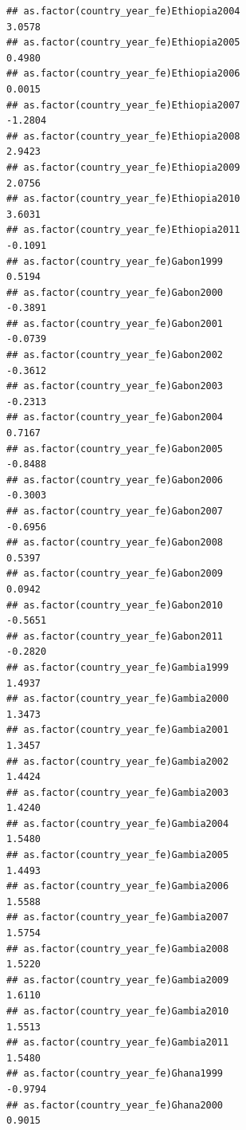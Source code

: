 \documentclass[
  a4paper,
]{article}
\begin{document}
\begin{verbatim}
## as.factor(country_year_fe)Ethiopia2004                          3.0578
## as.factor(country_year_fe)Ethiopia2005                          0.4980
## as.factor(country_year_fe)Ethiopia2006                          0.0015
## as.factor(country_year_fe)Ethiopia2007                         -1.2804
## as.factor(country_year_fe)Ethiopia2008                          2.9423
## as.factor(country_year_fe)Ethiopia2009                          2.0756
## as.factor(country_year_fe)Ethiopia2010                          3.6031
## as.factor(country_year_fe)Ethiopia2011                         -0.1091
## as.factor(country_year_fe)Gabon1999                             0.5194
## as.factor(country_year_fe)Gabon2000                            -0.3891
## as.factor(country_year_fe)Gabon2001                            -0.0739
## as.factor(country_year_fe)Gabon2002                            -0.3612
## as.factor(country_year_fe)Gabon2003                            -0.2313
## as.factor(country_year_fe)Gabon2004                             0.7167
## as.factor(country_year_fe)Gabon2005                            -0.8488
## as.factor(country_year_fe)Gabon2006                            -0.3003
## as.factor(country_year_fe)Gabon2007                            -0.6956
## as.factor(country_year_fe)Gabon2008                             0.5397
## as.factor(country_year_fe)Gabon2009                             0.0942
## as.factor(country_year_fe)Gabon2010                            -0.5651
## as.factor(country_year_fe)Gabon2011                            -0.2820
## as.factor(country_year_fe)Gambia1999                            1.4937
## as.factor(country_year_fe)Gambia2000                            1.3473
## as.factor(country_year_fe)Gambia2001                            1.3457
## as.factor(country_year_fe)Gambia2002                            1.4424
## as.factor(country_year_fe)Gambia2003                            1.4240
## as.factor(country_year_fe)Gambia2004                            1.5480
## as.factor(country_year_fe)Gambia2005                            1.4493
## as.factor(country_year_fe)Gambia2006                            1.5588
## as.factor(country_year_fe)Gambia2007                            1.5754
## as.factor(country_year_fe)Gambia2008                            1.5220
## as.factor(country_year_fe)Gambia2009                            1.6110
## as.factor(country_year_fe)Gambia2010                            1.5513
## as.factor(country_year_fe)Gambia2011                            1.5480
## as.factor(country_year_fe)Ghana1999                            -0.9794
## as.factor(country_year_fe)Ghana2000                             0.9015

\end{verbatim}
\end{document}
